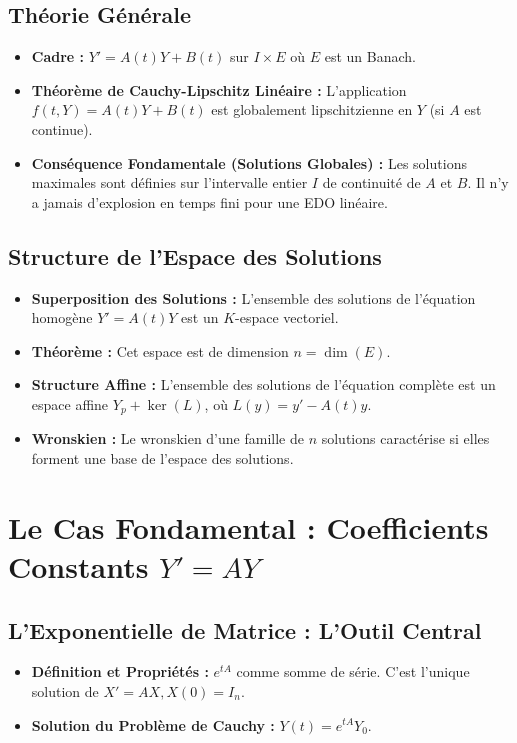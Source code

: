 \documentclass[12pt, a4paper, parskip=full]{report}
\theoremstyle{agregstyle}
\begin{document}
\subsection{Théorie Générale}
\begin{itemize}
    \item \textbf{Cadre :} $Y'=A(t)Y+B(t)$ sur $I \times E$ où $E$ est un Banach.
    \item \textbf{Théorème de Cauchy-Lipschitz Linéaire :} L'application $f(t,Y)=A(t)Y+B(t)$ est globalement lipschitzienne en $Y$ (si $A$ est continue).
    \item \textbf{Conséquence Fondamentale (Solutions Globales) :} Les solutions maximales sont définies sur l'intervalle entier $I$ de continuité de $A$ et $B$. Il n'y a jamais d'explosion en temps fini pour une EDO linéaire.
\end{itemize}
\subsection{Structure de l'Espace des Solutions}
\begin{itemize}
    \item \textbf{Superposition des Solutions :} L'ensemble des solutions de l'équation homogène $Y'=A(t)Y$ est un $K$-espace vectoriel.
    \item \textbf{Théorème :} Cet espace est de dimension $n = \dim(E)$.
    \item \textbf{Structure Affine :} L'ensemble des solutions de l'équation complète est un espace affine $Y_p + \ker(L)$, où $L(y) = y' - A(t)y$.
    \item \textbf{Wronskien :} Le wronskien d'une famille de $n$ solutions caractérise si elles forment une base de l'espace des solutions.
\end{itemize}

\section{Le Cas Fondamental : Coefficients Constants $Y'=AY$}
\subsection{L'Exponentielle de Matrice : L'Outil Central}
\begin{itemize}
    \item \textbf{Définition et Propriétés :} $e^{tA}$ comme somme de série. C'est l'unique solution de $X'=AX, X(0)=I_n$.
    \item \textbf{Solution du Problème de Cauchy :} $Y(t) = e^{tA}Y_0$.
\end{itemize}
\end{document}
